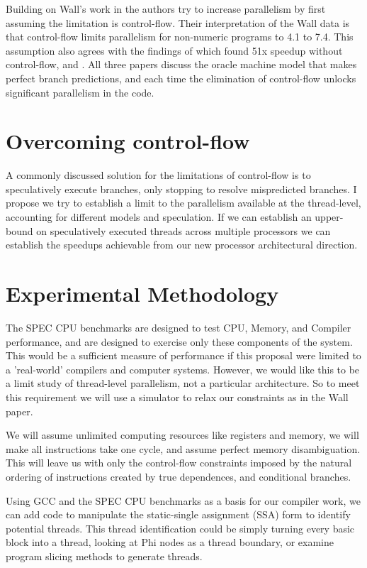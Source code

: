 \documentclass[12pt,twoside,letterpaper]{article}
\begin{document}
Building on Wall's work in \cite{Lam:1992p188} the authors try to increase parallelism by first assuming the limitation is control-flow. Their interpretation of the Wall data is that control-flow limits parallelism for non-numeric programs to 4.1 to 7.4. This assumption also agrees with the findings of \cite{Riseman:1972p215} which found 51x speedup without control-flow, and \cite{Nicolau:1984p217}. All three papers discuss the oracle machine model that makes perfect branch predictions, and each time the elimination of control-flow unlocks significant parallelism in the code.

\section*{Overcoming control-flow}
A commonly discussed solution for the limitations of control-flow is to speculatively execute branches, only stopping to resolve mispredicted branches. I propose we try to establish a limit to the parallelism available at the thread-level, accounting for different models and speculation. If we can establish an upper-bound on speculatively executed threads across multiple processors we can establish the speedups achievable from our new processor architectural direction.

\section*{Experimental Methodology}
The SPEC CPU benchmarks are designed to test CPU, Memory, and Compiler performance, and are designed to exercise only these components of the system. This would be a sufficient measure of performance if this proposal were limited to a 'real-world' compilers and computer systems. However, we would like this to be a limit study of thread-level parallelism, not a particular architecture. So to meet this requirement we will use a simulator to relax our constraints as in the Wall paper.

We will assume unlimited computing resources like registers and memory, we will make all instructions take one cycle, and assume perfect memory disambiguation. This will leave us with only the control-flow constraints imposed by the natural ordering of instructions created by true dependences, and conditional branches.

Using GCC and the SPEC CPU benchmarks as a basis for our compiler work, we can add code to manipulate the static-single assignment (SSA) form to identify potential threads. This thread identification could be simply turning every basic block into a thread, looking at Phi nodes as a thread boundary, or examine program slicing methods to generate threads.
\end{document}
